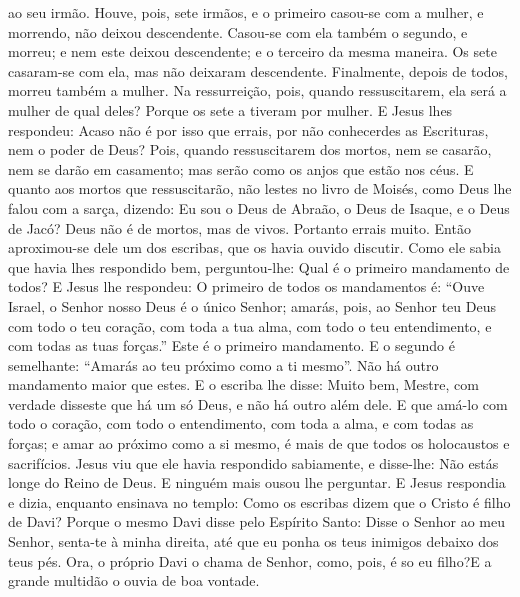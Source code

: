 { ao seu irmão.
  Houve, pois, sete irmãos, e o primeiro casou-se com a mulher, e morrendo, não deixou descendente.
  Casou-se com ela também o segundo, e morreu; e nem este deixou descendente; e o terceiro da mesma maneira.
  Os sete casaram-se com ela, mas não deixaram descendente. Finalmente, depois de todos, morreu também a mulher.
  Na ressurreição, pois, quando ressuscitarem, ela será a mulher de qual deles? Porque os sete a tiveram por mulher.
  E Jesus lhes respondeu: Acaso não é por isso que errais, por não conhecerdes as Escrituras, nem o poder de Deus?
  Pois, quando ressuscitarem dos mortos, nem se casarão, nem se darão em casamento; mas serão como os anjos que estão nos céus.
  E quanto aos mortos que ressuscitarão, não lestes no livro de Moisés, como Deus lhe falou com a sarça, dizendo: Eu sou o Deus de Abraão, o Deus de Isaque, e o Deus de Jacó?
{}
  Deus não é
{} de mortos, mas de vivos. Portanto errais muito.
  Então aproximou-se dele um dos escribas, que os havia ouvido discutir. Como ele sabia que
{} havia lhes respondido bem, perguntou-lhe: Qual é o primeiro mandamento de todos?
  E Jesus lhe respondeu: O primeiro de todos os mandamentos é: “Ouve Israel, o Senhor nosso Deus é o único Senhor;
  amarás, pois, ao Senhor teu Deus com todo o teu coração, com toda a tua alma, com todo o teu entendimento, e com todas as tuas forças.”
{} Este é o primeiro mandamento.
  E o segundo é semelhante: “Amarás ao teu próximo como a ti mesmo”.
{} Não há outro mandamento maior que estes.
  E o escriba lhe disse: Muito bem, Mestre, com verdade disseste que há um só Deus, e não há outro além dele.
  E que amá-lo com todo o coração, com todo o entendimento, com toda a alma, e com todas as forças; e amar ao próximo como a si mesmo, é mais de que todos os holocaustos e sacrifícios.
  Jesus viu que ele havia respondido sabiamente, e disse-lhe: Não estás longe do Reino de Deus. E ninguém mais ousou lhe perguntar.
  E Jesus respondia e dizia, enquanto ensinava no templo: Como os escribas dizem que o Cristo é filho de Davi?
  Porque o mesmo Davi disse pelo Espírito Santo: Disse o Senhor ao meu Senhor, senta-te à minha direita, até que eu ponha os teus inimigos debaixo dos teus pés.
{}
  Ora,
{} o próprio Davi o chama de Senhor, como, pois, é so eu filho?E a grande multidão o ouvia de boa vontade.
}
